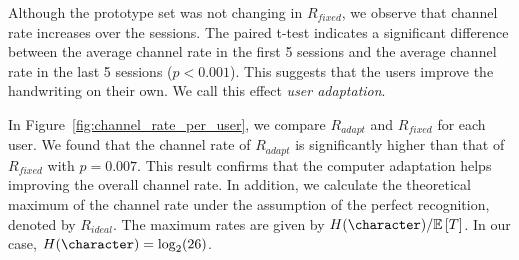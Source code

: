 \documentclass{sigchi}
\begin{document}
Although the prototype set was not changing in $R_{fixed}$, we observe
that channel rate increases over the sessions. The paired t-test
indicates a significant difference between the average channel rate in
the first 5 sessions and the average channel rate in the last 5
sessions ($p < 0.001$). This suggests that the users improve the
handwriting on their own. We call this effect {\em user
  adaptation}. 

In Figure~\ref{fig:channel_rate_per_user}, we compare $R_{adapt}$ and
$R_{fixed}$ for each user. We found that the channel rate of
$R_{adapt}$ is significantly higher than that of $R_{fixed}$ with $p = 0.007$.
This result confirms that the computer adaptation helps improving the
overall channel rate. In addition, we calculate the theoretical
maximum of the channel rate under the assumption of the perfect
recognition, denoted by $R_{ideal}$. The maximum rates are given by
$H(\character) / \expectedDuration$. In our case, $H(\character) =
\log_2(26)$. 
\end{document}
